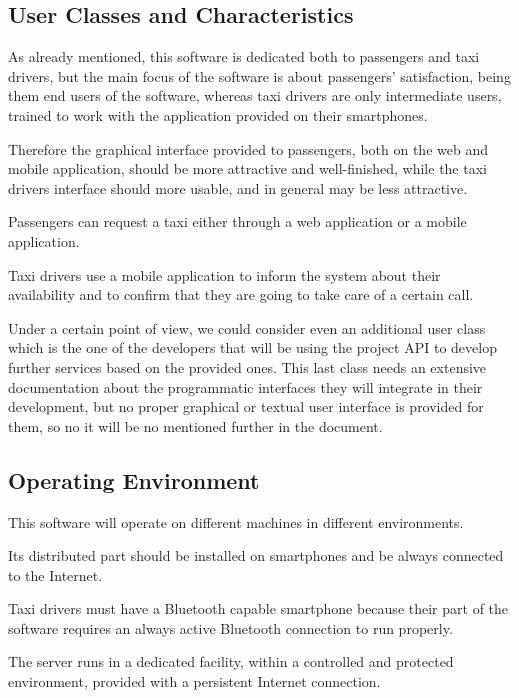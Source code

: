 \subsection{User Classes and Characteristics}
As already mentioned, this software is dedicated both to passengers and taxi drivers, but the main focus of the software is about passengers' satisfaction, being them end users of the software, whereas taxi drivers are only intermediate users, trained to work with the application provided on their smartphones.\par
Therefore the graphical interface provided to passengers, both on the web and mobile application, should be more attractive and well-finished, while the taxi drivers interface should more usable, and in general may be less attractive.\par
Passengers can request a taxi either through a web application or a mobile application.\par
Taxi drivers use a mobile application to inform the system about their availability and to confirm that they are going to take care of a certain call.\par
Under a certain point of view, we could consider even an additional user class which is the one of the developers that will be using the project API to develop further services based on the provided ones.
This last class needs an extensive documentation about the programmatic interfaces they will integrate in their development, but no proper graphical or textual user interface is provided for them, so no it will be no mentioned further in the document.
\subsection{Operating Environment}
This software will operate on different machines in different environments.\par
Its distributed part should be installed on smartphones and be always connected to the Internet.\par
Taxi drivers must have a Bluetooth capable smartphone because their part of the software requires an always active Bluetooth connection to run properly.\par
The server runs in a dedicated facility, within a controlled and protected environment, provided with a persistent Internet connection.
